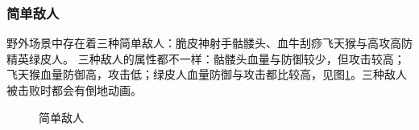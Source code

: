 \documentclass{ctexart}
\begin{document}
\subsubsection{简单敌人}
野外场景中存在着三种简单敌人：脆皮神射手骷髅头、血牛刮痧飞天猴与高攻高防精英绿皮人。
三种敌人的属性都不一样：骷髅头血量与防御较少，但攻击较高；飞天猴血量防御高，攻击低；绿皮人血量防御与攻击都比较高，见图\ref{fig:简单敌人}。三种敌人被击败时都会有倒地动画。
\begin{figure}[h]
\centering
{}
\caption{\label{fig:简单敌人}简单敌人}
\end{figure}
\end{document}
